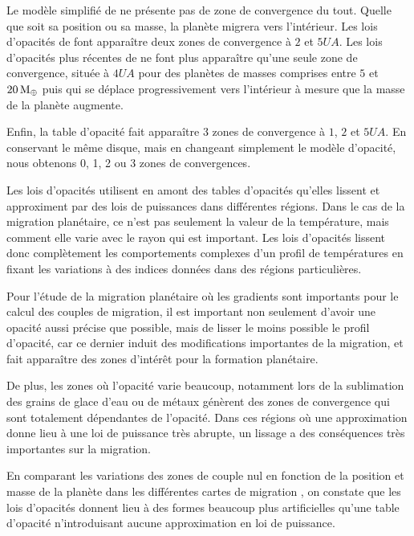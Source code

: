 Le modèle simplifié de \cite{chambers2009analytic} ne présente pas de zone de convergence du tout. Quelle que soit sa position ou sa masse, la planète migrera vers l'intérieur. Les lois d'opacités de \cite{bell1994FU} font apparaître deux zones de convergence à $2$ et $5\unit{UA}$. Les lois d'opacités plus récentes de \cite{zhu2009nonsteady} ne font plus apparaître qu'une seule zone de convergence, située à $4\unit{UA}$ pour des planètes de masses comprises entre $5$ et $20\mathrm{\thinspace M_\oplus}$ puis qui se déplace progressivement vers l'intérieur à mesure que la masse de la planète augmente. 

Enfin, la table d'opacité \cite{hure2000transition} fait apparaître 3 zones de convergence à $1$, $2$ et $5\unit{UA}$. En conservant le même disque, mais en changeant simplement le modèle d'opacité, nous obtenons 0, 1, 2 ou 3 zones de convergences. 

Les lois d'opacités utilisent en amont des tables d'opacités qu'elles lissent et approximent par des lois de puissances dans différentes régions. Dans le cas de la migration planétaire, ce n'est pas seulement la valeur de la température, mais comment elle varie avec le rayon qui est important. Les lois d'opacités lissent donc complètement les comportements complexes d'un profil de températures en fixant les variations à des indices données dans des régions particulières. 

Pour l'étude de la migration planétaire où les gradients sont importants pour le calcul des couples de migration, il est important non seulement d'avoir une opacité aussi précise que possible, mais de lisser le moins possible le profil d'opacité, car ce dernier induit des modifications importantes de la migration, et fait apparaître des zones d'intérêt pour la formation planétaire. 

De plus, les zones où l'opacité varie beaucoup, notamment lors de la sublimation des grains de glace d'eau ou de métaux génèrent des zones de convergence qui sont totalement dépendantes de l'opacité. Dans ces régions où une approximation donne lieu à une loi de puissance très abrupte, un lissage a des conséquences très importantes sur la migration. 

En comparant les variations des zones de couple nul en fonction de la position et masse de la planète dans les différentes cartes de migration , on constate que les lois d'opacités \citep{bell1994FU, zhu2009nonsteady, chambers2009analytic} donnent lieu à des formes beaucoup plus artificielles qu'une table d'opacité \citep{hure2000transition} n'introduisant aucune approximation en loi de puissance.

